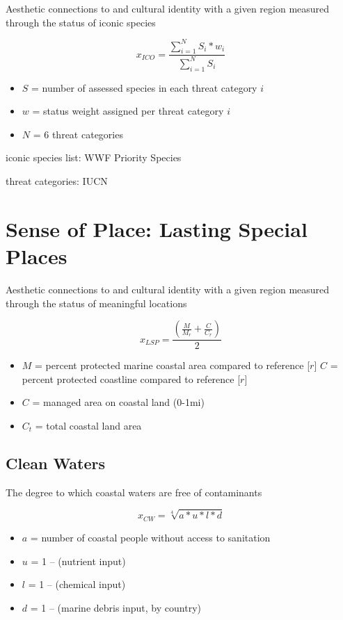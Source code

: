 \documentclass[
]{article}
\begin{document}
Aesthetic connections to and cultural identity with a given region
measured through the status of iconic species

\[
x_{ICO} = \frac{\sum_{i=1}^{N} S_{i} * w_{i}}{\sum_{i=1}^{N} S_{i}} 
\]

\begin{itemize}
\item
  \(S\) = number of assessed species in each threat category \(i\)
\item
  \(w\) = status weight assigned per threat category \(i\)
\item
  \(N\) = 6 threat categories
\end{itemize}

iconic species list: WWF Priority Species

threat categories: IUCN

\hypertarget{sense-of-place-lasting-special-places}{%
\section{Sense of Place: Lasting Special
Places}\label{sense-of-place-lasting-special-places}}

Aesthetic connections to and cultural identity with a given region
measured through the status of meaningful locations

\[
x_{LSP} = \frac{(\frac{M}{M_{r}} + \frac{C}{C_{r}})}{2} 
\]

\begin{itemize}
\item
  \(M\) = percent protected marine coastal area compared to reference
  {[}\(r\){]} \(C\) = percent protected coastline compared to reference
  {[}\(r\){]}
\item
  \(C\) = managed area on coastal land (0-1mi)
\item
  \(C_{t}\) = total coastal land area
\end{itemize}

\hypertarget{clean-waters}{%
\subsection{Clean Waters}\label{clean-waters}}

The degree to which coastal waters are free of contaminants

\[
x_{CW} = \sqrt[4]{a * u * l * d}
\]

\begin{itemize}
\item
  \(a\) = number of coastal people without access to sanitation
\item
  \(u\) = 1 -- (nutrient input)
\item
  \(l\) = 1 -- (chemical input)
\item
  \(d\) = 1 -- (marine debris input, by country)
\end{itemize}
\end{document}
